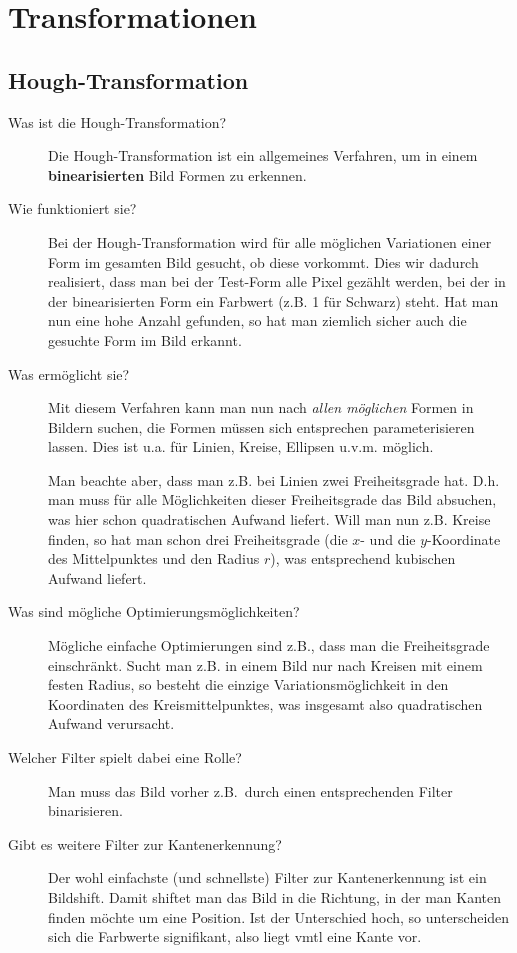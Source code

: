 \section{Transformationen}
\subsection{Hough-Transformation}
\begin{description}
	\item[Was ist die Hough-Transformation?]
      Die Hough-Transformation ist ein allgemeines Verfahren, um in einem \textbf{binearisierten} Bild Formen zu erkennen.
	\item[Wie funktioniert sie?]
      Bei der Hough-Transformation wird für alle möglichen Variationen einer Form im gesamten Bild
      gesucht, ob diese vorkommt. Dies wir dadurch realisiert, dass man bei der Test-Form alle Pixel gezählt
      werden, bei der in der binearisierten Form ein Farbwert (z.B. 1 für Schwarz) steht. Hat man nun eine hohe Anzahl
      gefunden, so hat man ziemlich sicher auch die gesuchte Form im Bild erkannt.
	\item[Was ermöglicht sie?]
      Mit diesem Verfahren kann man nun nach \emph{allen möglichen} Formen in Bildern suchen, die Formen müssen sich 
      entsprechen parameterisieren lassen. Dies ist u.a. für Linien, Kreise, Ellipsen u.v.m. möglich.

      Man beachte aber, dass man z.B. bei Linien zwei Freiheitsgrade hat. D.h. man muss für alle Möglichkeiten dieser
      Freiheitsgrade das Bild absuchen, was hier schon quadratischen Aufwand liefert. Will man nun z.B. Kreise finden,
      so hat man schon drei Freiheitsgrade (die $x$- und die $y$-Koordinate des Mittelpunktes und den Radius $r$), was
      entsprechend kubischen Aufwand liefert.
    \item[Was sind mögliche Optimierungsmöglichkeiten?]
      Mögliche einfache Optimierungen sind z.B., dass man die Freiheitsgrade einschränkt. Sucht man z.B. in einem Bild
      nur nach Kreisen mit einem festen Radius, so besteht die einzige Variationsmöglichkeit in den Koordinaten des
      Kreismittelpunktes, was insgesamt also quadratischen Aufwand verursacht.
	\item[Welcher Filter spielt dabei eine Rolle?]
  	Man muss das Bild vorher z.B.\ durch einen entsprechenden Filter binarisieren.
	\item[Gibt es weitere Filter zur Kantenerkennung?]
      Der wohl einfachste (und schnellste) Filter zur Kantenerkennung ist ein Bildshift. Damit shiftet man das Bild
      in die Richtung, in der man Kanten finden möchte um eine Position. Ist der Unterschied hoch, so unterscheiden
      sich die Farbwerte signifikant, also liegt vmtl eine Kante vor.\\


\end{description}
